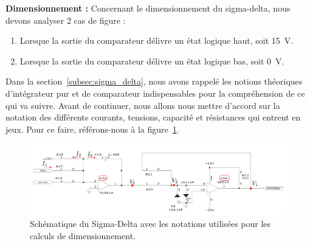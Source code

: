\documentclass[10pt, oneside, a4paper]{article}
\begin{document}
\noindent\textbf{Dimensionnement :} Concernant le dimensionnement du sigma-delta, nous devons analyser 2 cas de figure : 
\begin{enumerate}
    \item Lorsque la sortie du comparateur délivre un état logique haut, soit \SI{15}{\volt}.
    \item Lorsque la sortie du comparateur délivre un état logique bas, soit \SI{0}{\volt}.
\end{enumerate}
Dans la section~\ref{subsec:sigma_delta}, nous avons rappelé les notions théoriques d'intégrateur pur et de comparateur indispensables pour la compréhension de ce qui va suivre.
Avant de continuer, nous allons nous mettre d'accord sur la notation des différents courants, tensions, capacité et résistances qui entrent en jeux.
Pour ce faire, référons-nous à la figure~\ref{fig:notation}. 
\begin{figure}[!ht]
    \centering
    \includegraphics[width=\textwidth]{image/Sigma_Delta_Notation.png}
    \caption{Schématique du Sigma-Delta avec les notations utilisées pour les calculs de dimensionnement.}
    \label{fig:notation}
\end{figure}
\newpage
\end{document}

